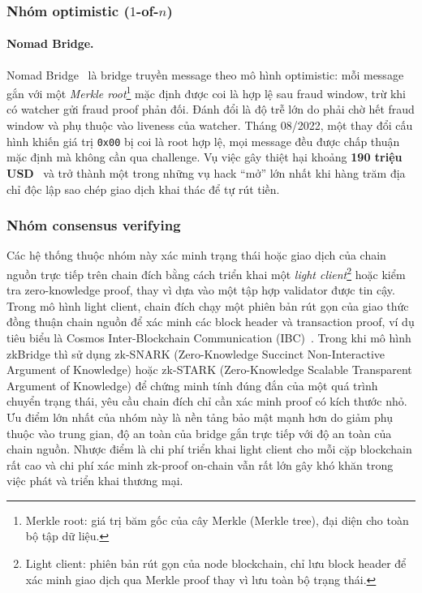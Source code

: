 \subsubsection*{Nhóm optimistic ($1$-of-$n$)}

\paragraph{Nomad Bridge.}
Nomad Bridge~\cite{nomad_docs} là bridge truyền message theo mô hình optimistic:
mỗi message gắn với một 
\textit{Merkle root}\footnote{Merkle root: giá trị băm gốc của cây Merkle (Merkle tree), đại diện cho toàn bộ tập dữ liệu.} mặc định được coi là hợp lệ sau
fraud window, trừ khi có watcher gửi fraud proof phản đối. Đánh đổi là độ trễ
lớn do phải chờ hết fraud window và phụ thuộc vào liveness của watcher.
Tháng 08/2022, một thay đổi cấu hình khiến giá trị \texttt{0x00} bị coi là
root hợp lệ, mọi message đều được chấp thuận mặc định mà không cần qua
challenge. Vụ việc gây thiệt hại khoảng \textbf{190 triệu USD}~\cite{nomad_immunefi}
và trở thành một trong những vụ hack ``mở'' lớn nhất khi hàng trăm địa chỉ
độc lập sao chép giao dịch khai thác để tự rút tiền.

\subsubsection*{Nhóm consensus verifying}

Các hệ thống thuộc nhóm này xác minh trạng thái hoặc giao dịch của chain nguồn
trực tiếp trên chain đích bằng cách triển khai một \textit{light client}\footnote{Light client: phiên bản rút gọn của node blockchain, chỉ lưu block header để xác minh giao dịch qua Merkle proof thay vì lưu toàn bộ trạng thái.} hoặc kiểm
tra zero-knowledge proof, thay vì dựa vào một tập hợp validator được tin cậy.
Trong mô hình light client, chain đích chạy một phiên bản rút gọn của giao thức đồng
thuận chain nguồn để xác minh các block header và transaction proof, ví dụ tiêu biểu là
Cosmos Inter-Blockchain Communication (IBC)~\cite{cosmos_ibc}.
Trong khi mô hình zkBridge thì sử dụng zk-SNARK (Zero-Knowledge Succinct Non-Interactive Argument of Knowledge) hoặc zk-STARK (Zero-Knowledge Scalable Transparent Argument of Knowledge) để chứng minh tính đúng đắn của
một quá trình chuyển trạng thái, yêu cầu chain đích chỉ cần xác minh proof có kích thước nhỏ.
Ưu điểm lớn nhất của nhóm này là nền tảng bảo mật mạnh hơn do giảm
phụ thuộc vào trung gian, độ an toàn của bridge gắn trực tiếp với độ an toàn của
chain nguồn.
Nhược điểm là chi phí triển khai light client cho mỗi cặp blockchain rất cao và chi phí
xác minh zk-proof on-chain vẫn rất lớn gây khó khăn trong việc phát và triển khai
thương mại.

